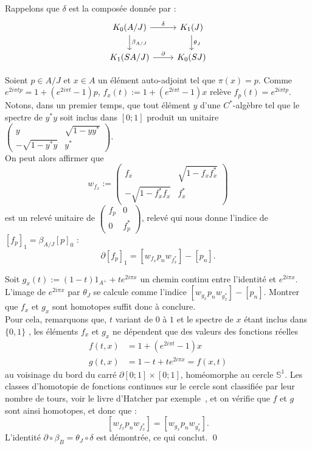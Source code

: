 \begin{dem}
Rappelons que $\delta$ est la composée donnée par :
\[
\begin{tikzcd}
K_0(A/J)  \arrow{r}{\delta}\arrow{d}{\beta_{A/J}}	& K_1(J) \arrow{d}{\theta_J} \\
K_1(S A/J) \arrow{r}{\partial} 	& K_0(SJ)
\end{tikzcd}
\]

Soient $p\in A/J$ et $x \in A$ un élément auto-adjoint tel que $\pi(x)=p$. Comme $e^{2i\pi tp}=1+(e^{2i\pi t}-1)p$, $f_x(t):=1+(e^{2i\pi t}-1)x$ relève $f_p(t)=e^{2i\pi tp}$. \\

Notons, dans un premier temps, que tout élément $y$ d'une $C^*$-algèbre tel que le spectre de $y^*y$ soit inclus dans $[0;1]$ produit un unitaire $\begin{pmatrix} y & \sqrt{1-yy^*}\\ -\sqrt{1-y^*y} & y^* \end{pmatrix}$. \\
On peut alors affirmer que 
\[w_{f_x}:=\begin{pmatrix} f_x & \sqrt{1-f_xf_x^*}\\ -\sqrt{1-f_x^*f_x} & f^*_x \end{pmatrix}\]
est un relevé unitaire de $\begin{pmatrix}f_p & 0\\ 0 & f_p^*\end{pmatrix}$, relevé qui nous donne l'indice de $[f_p]_1=\beta_{A/J}[p]_0$ :  
\[\partial [f_p]_1= [w_{f_x} p_n w_{f_x^*}]-[p_n].\]

Soit $g_x(t):=(1-t)1_{A^+}+t e^{2i \pi x}$ un chemin continu entre l'identité et $e^{2i\pi x}$. L'image de $e^{2i\pi x}$ par $\theta_J$ se calcule comme l'indice $[w_{g_x} p_n w_{g^*_x}]-[p_n]$. Montrer que $f_x$ et $g_x$ sont homotopes suffit donc à conclure. \\

Pour cela, remarquons que, $t$ variant de $0$ à $1$ et le spectre de $x$ étant inclus dans $\{0,1\}$ %
, les éléments $f_x$ et $g_x$ ne dépendent que des valeurs des fonctions réelles
\[\begin{array}{rl}f(t,x) &=1+(e^{2i\pi t}-1)x \\
g(t,x) &=1-t+te^{2i\pi x}=f(x,t)\end{array}\]
au voisinage du bord du carré $\partial [0;1]\times [0;1]$, homéomorphe au cercle $\mathbb S^1$. Les classes d'homotopie de fonctions continues sur le cercle sont classifiée par leur nombre de tours, voir le livre d'Hatcher par exemple~\cite{Hatcher}, et on vérifie que $f$ et $g$ sont ainsi homotopes, et donc que :
\[[w_{f_x} p_n w_{f_x^*}]=[w_{g_x} p_n w_{g^*_x}].\]
L'identité $\partial \circ \beta_B= \theta_J\circ \delta$ est démontrée, ce qui conclut.
\qed
\end{dem}


